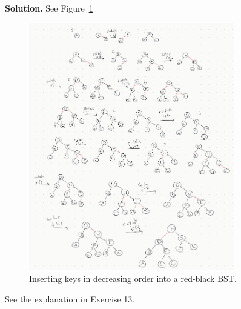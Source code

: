 \documentclass[12pt, a4paper]{article}
\newenvironment{sol}[1][Solution]
{\par\medskip\noindent \textbf{#1.} }
{\medskip}
\begin{document}
	\begin{sol}
		See Figure~\ref{fig:ex-14}
		\begin{figure}
			\centering
			\includegraphics[width=0.8\textwidth]{exercise-14}
			\caption{Inserting keys in decreasing order into a red-black BST.}
			\label{fig:ex-14}
		\end{figure}
		See the explanation in Exercise 13.
	\end{sol}
	
\end{document}
